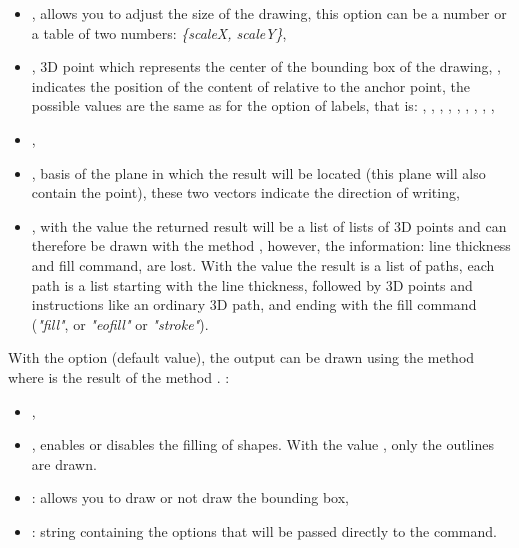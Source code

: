 \begin{itemize}
    \item {}, allows you to adjust the size of the drawing, this option can be a number or a table of two numbers: \emph{\{scaleX, scaleY\}},

    \item {}, 3D point which represents the center of the bounding box of the drawing,
    , indicates the position of the content of  relative to the anchor point, the possible values ​​are the same as for the  option of labels, that is: , , , , , , , , ,

    \item {},

    \item {}, basis of the plane in which the result will be located (this plane will also contain the  point), these two vectors indicate the direction of writing,

    \item {}, with the value \true the returned result will be a list of lists of 3D points and can therefore be drawn with the method , however, the information: line thickness and fill command, are lost. With the value \false the result is a list of paths, each path is a list starting with the line thickness, followed by 3D points and instructions like an ordinary 3D path, and ending with the fill command (\emph{"fill"}, or \emph{"eofill"} or \emph{"stroke"}).
\end{itemize}

With the option  (default value), the output can be drawn using the method  where  is the result of the method . \writeoptions:

\begin{itemize}
    \item {},
    \item {}, enables or disables the filling of shapes. With the value \true, only the outlines are drawn. 
    \item {}: allows you to draw or not draw the bounding box,
    \item {}: string containing the options that will be passed directly to the \drawcmd command.
\end{itemize}

